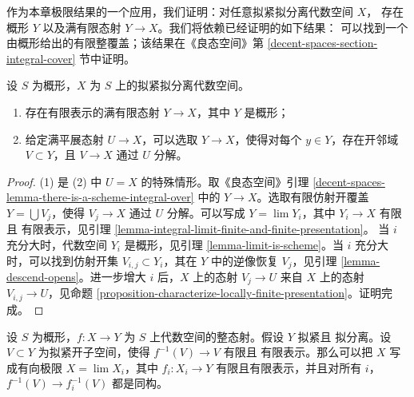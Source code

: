 \noindent
作为本章极限结果的一个应用，我们证明：对任意拟紧拟分离代数空间 $X$，
存在概形 $Y$ 以及满有限态射 $Y \to X$。我们将依赖已经证明的如下结果：
可以找到一个由概形给出的有限整覆盖；该结果在《良态空间》第
\ref{decent-spaces-section-integral-cover} 节中证明。

\begin{proposition}
\label{proposition-there-is-a-scheme-finite-over}
设 $S$ 为概形，$X$ 为 $S$ 上的拟紧拟分离代数空间。
\begin{enumerate}
\item 存在有限表示的满有限态射 $Y \to X$，其中 $Y$ 是概形；
\item 给定满平展态射 $U \to X$，可以选取 $Y \to X$，使得对每个
$y \in Y$，存在开邻域 $V \subset Y$，且 $V \to X$ 通过 $U$ 分解。
\end{enumerate}
\end{proposition}

\begin{proof}
(1) 是 (2) 中 $U = X$ 的特殊情形。取《良态空间》引理
\ref{decent-spaces-lemma-there-is-a-scheme-integral-over} 中的
$Y \to X$。选取有限仿射开覆盖 $Y = \bigcup V_j$，使得 $V_j \to X$
通过 $U$ 分解。可以写成 $Y = \lim Y_i$，其中 $Y_i \to X$ 有限且
有限表示，见引理 \ref{lemma-integral-limit-finite-and-finite-presentation}。
当 $i$ 充分大时，代数空间 $Y_i$ 是概形，见引理
\ref{lemma-limit-is-scheme}。当 $i$ 充分大时，可以找到仿射开集
$V_{i, j} \subset Y_i$，其在 $Y$ 中的逆像恢复 $V_j$，见引理
\ref{lemma-descend-opens}。进一步增大 $i$ 后，$X$ 上的态射
$V_j \to U$ 来自 $X$ 上的态射 $V_{i, j} \to U$，见命题
\ref{proposition-characterize-locally-finite-presentation}。证明完成。
\end{proof}

\begin{lemma}
\label{lemma-integral-limit-finite-and-finite-presentation-refined}
设 $S$ 为概形，$f : X \to Y$ 为 $S$ 上代数空间的整态射。假设 $Y$ 拟紧且
拟分离。设 $V \subset Y$ 为拟紧开子空间，使得 $f^{-1}(V) \to V$ 有限且
有限表示。那么可以把 $X$ 写成有向极限 $X = \lim X_i$，其中
$f_i : X_i \to Y$ 有限且有限表示，并且对所有 $i$，
$f^{-1}(V) \to f_i^{-1}(V)$ 都是同构。
\end{lemma}

